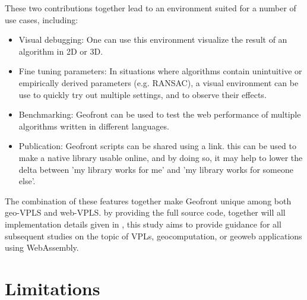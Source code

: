 These two contributions together lead to an environment suited for a number of use cases, including: 
\begin{itemize}
  \item Visual debugging: One can use this environment visualize the result of an algorithm in 2D or 3D.
  \item Fine tuning parameters: In situations where algorithms contain unintuitive or empirically derived parameters (e.g. RANSAC), a visual environment can be use to quickly try out multiple settings, and to observe their effects.
  \item Benchmarking: Geofront can be used to test the web performance of multiple algorithms written in different languages. 
  \item Publication: Geofront scripts can be shared using a link. 
    this can be used to make a native library usable online, and by doing so, it may help to lower the delta between 'my library works for me' and 'my library works for someone else'.
\end{itemize} 
The combination of these features together make Geofront unique among both \\ geo-VPLS and web-VPLS. 
by providing the full source code, together will all implementation details given in , this study aims to provide guidance for all subsequent studies on the topic of VPLs, geocomputation, or geoweb applications using WebAssembly.



\section{Limitations}
\label{sec:limitations}

